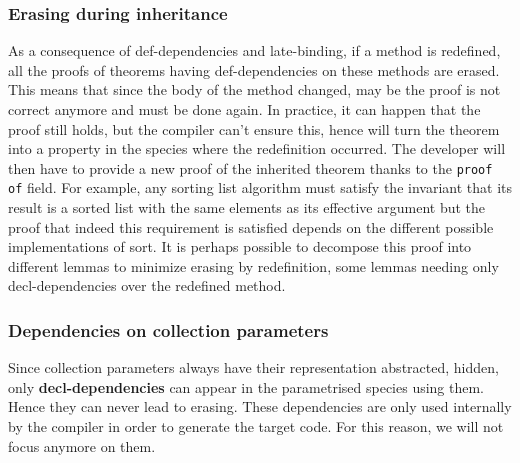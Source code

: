 \subsubsection{Erasing during inheritance}
\label{erasing}
As a consequence of def-dependencies and late-binding, if a method is
redefined, all the proofs of theorems having def-dependencies on these
methods are erased. This means that since the body of the method
changed, may be the proof is not correct anymore and must be done
again. In practice, it can happen that the proof still holds, but the
compiler can't ensure this, hence will turn the theorem into a
property in the species where the redefinition occurred. The developer
will then have to provide a new proof of the inherited theorem thanks
to the {\tt proof of} field. For example, any sorting list algorithm
must satisfy the invariant that its result is a sorted list with the
same elements as its effective argument  but the
proof that indeed this requirement is satisfied depends on the
different possible implementations of sort. It is perhaps possible to
decompose this proof into different lemmas to minimize erasing by
redefinition, some lemmas needing only decl-dependencies over the
redefined method.



\subsubsection{Dependencies on collection parameters}
Since collection parameters always have their representation abstracted,
hidden, only {\bf decl-dependencies} can appear in the parametrised
species using them. Hence they can never lead to erasing. These
dependencies are only used internally by the {\focal} compiler in order
to generate the target code. For this reason, we will not focus anymore
on them.

